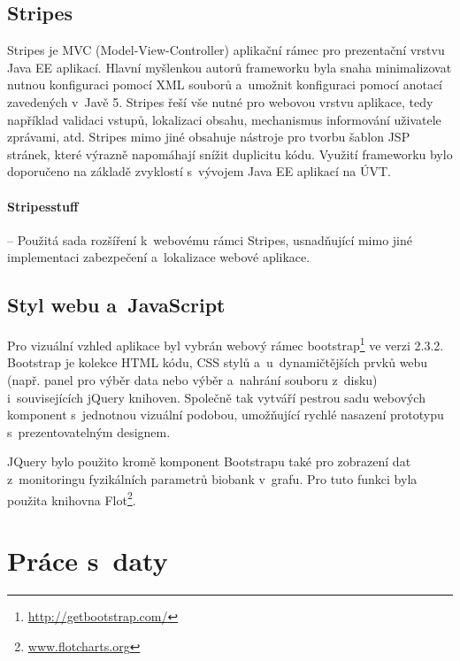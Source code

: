 \documentclass[11pt, draft, oneside]{fithesis2}
\begin{document}
\subsection{Stripes}
Stripes je MVC (Model-View-Controller) aplikační rámec pro prezentační vrstvu Java EE aplikací. Hlavní myšlenkou autorů frameworku byla snaha minimalizovat nutnou konfiguraci pomocí XML souborů a~umožnit konfiguraci pomocí anotací zavedených v~Javě 5. Stripes řeší vše nutné pro webovou vrstvu aplikace, tedy například validaci vstupů, lokalizaci obsahu, mechanismus informování uživatele zprávami, atd. Stripes mimo jiné obsahuje nástroje pro tvorbu šablon JSP stránek, které výrazně napomáhají snížit duplicitu kódu.
Využití frameworku bylo doporučeno na základě zvyklostí s~vývojem Java EE aplikací na ÚVT.

\paragraph*{Stripesstuff} -- Použitá sada rozšíření k~webovému rámci Stripes, usnadňující mimo jiné implementaci zabezpečení a~lokalizace webové aplikace. 

\subsection{Styl webu a~JavaScript}
Pro vizuální vzhled aplikace byl vybrán webový rámec bootstrap\footnote{\url{http://getbootstrap.com/}} ve verzi 2.3.2. Bootstrap je kolekce HTML kódu, CSS stylů a~u~dynamičtějších prvků webu (např. panel pro výběr data nebo výběr a~nahrání souboru z~disku) i~souvisejících jQuery knihoven. Společně tak vytváří pestrou sadu webových komponent s~jednotnou vizuální podobou, umožňující rychlé nasazení prototypu s~prezentovatelným designem. 

JQuery bylo použito kromě komponent Bootstrapu také pro zobrazení dat z~monitoringu fyzikálních parametrů biobank v~grafu. Pro tuto funkci byla použita knihovna Flot\footnote{\url{www.flotcharts.org}}. 


\section{Práce s~daty}
\end{document}
